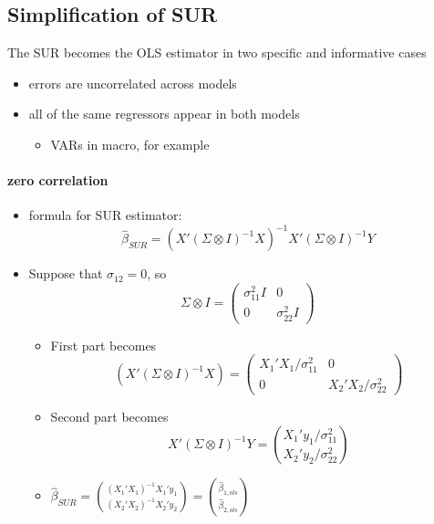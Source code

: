 \subsection{Simplification of SUR}

     The SUR becomes the OLS estimator in two specific and informative
     cases
\begin{itemize}
\item errors are uncorrelated across models
\item all of the same regressors appear in both models
\begin{itemize}
\item VARs in macro, for example
\end{itemize}
\end{itemize}

\paragraph{zero correlation}
\begin{itemize}
\item formula for SUR estimator:
       \[\hat\beta_{SUR} = (X'(\Sigma \otimes I)^{-1}X)^{-1}X'(\Sigma
       \otimes I)^{-1}Y\]
\item Suppose that $\sigma_{12} = 0$, so
        \[ \Sigma \otimes I = (\begin{matrix} \sigma_{11}^2 I & 0 \\ 0
        & \sigma_{22}^2 I \end{matrix})\]
\begin{itemize}
\item First part becomes \[(X'( \Sigma \otimes I)^{-1} X)
          = (\begin{matrix} X_1'X_1 / \sigma_{11}^2 & 0 \\ 0 & X_2'X_2
          / \sigma_{22}^2 \end{matrix}) \]
\item Second part becomes 
          \[X'(\Sigma \otimes I)^{-1}Y = \binom{X_1' y_1 /
          \sigma_{11}^2}{X_2'y_2 / \sigma_{22}^2}\]
\item $\hat\beta_{SUR} =
          \binom{(X_1'X_1)^{-1}X_1'y_1}{(X_2'X_2)^{-1}X_2'y_2} =
          \binom{\hat\beta_{1,ols}}{\hat\beta_{2,ols}}$
\end{itemize}
\end{itemize}

